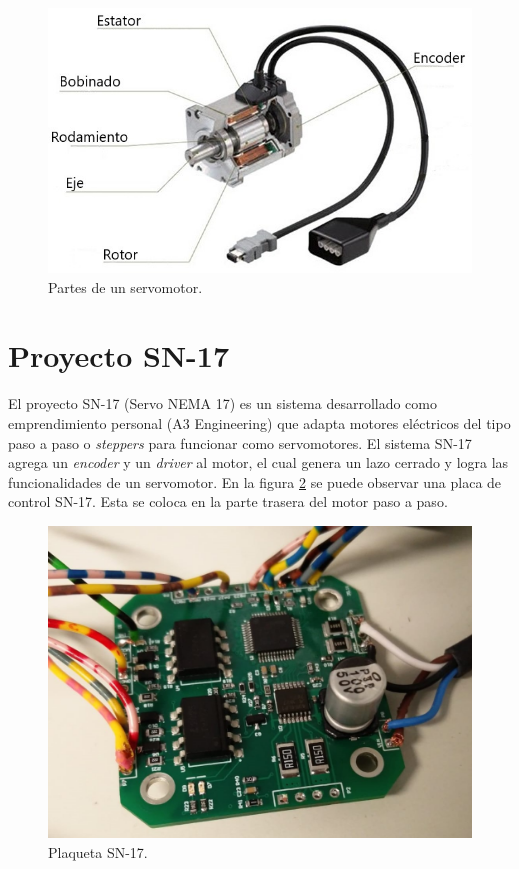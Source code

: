 \begin{figure}[htbp]
	\centering
	\includegraphics[scale=0.8]{./Figures/servomotor.jpg}
	\caption{Partes de un servomotor\protect\footnotemark .}
	\label{fig:servomotor}
\end{figure}



\section{Proyecto SN-17}

El proyecto SN-17 (Servo NEMA 17) es un sistema desarrollado como emprendimiento personal (A3 Engineering) que adapta motores eléctricos del tipo paso a paso o \textit{steppers} para funcionar como servomotores. El sistema SN-17 agrega un \textit{encoder} y un \textit{driver} al motor, el cual genera un lazo cerrado y logra las funcionalidades de un servomotor. En la figura \ref{fig:SN17} se puede observar una placa de control SN-17. Esta se coloca en la parte trasera del motor paso a paso.

\begin{figure}[htbp]
	\centering
	\includegraphics[scale=.3]{./Figures/SN17_5.jpeg}
	\caption{Plaqueta SN-17.}
	\label{fig:SN17}
\end{figure}

